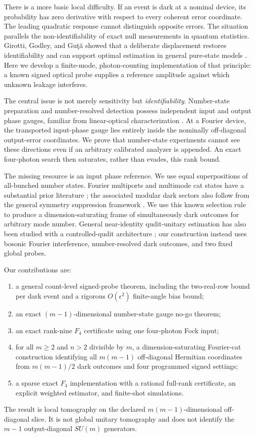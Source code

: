 \documentclass[aps,pra,reprint,amsmath,amssymb,superscriptaddress,longbibliography]{revtex4-2}
\begin{document}
There is a more basic local difficulty.  If an event is dark at a nominal
device, its probability has zero derivative with respect to every coherent
error coordinate.  The leading quadratic response cannot distinguish
opposite errors.  The situation parallels the non-identifiability of exact
null measurements in quantum statistics.  Girotti, Godley, and Guţă showed
that a deliberate displacement restores identifiability and can support
optimal estimation in general pure-state models \cite{Girotti2024}.  Here we
develop a finite-mode, photon-counting implementation of that principle:
a known signed optical probe supplies a reference amplitude against which
unknown leakage interferes.

The central issue is not merely sensitivity but \emph{identifiability}.
Number-state preparation and number-resolved detection possess independent
input and output phase gauges, familiar from linear-optical
characterization \cite{RahimiKeshari2013}.  At a Fourier device, the
transported input-phase gauge lies entirely inside the nominally
off-diagonal output-error coordinates.  We prove that number-state
experiments cannot see these directions even if an arbitrary calibrated
analyzer is appended.  An exact four-photon search then saturates, rather
than evades, this rank bound.

The missing resource is an input phase reference.  We use equal
superpositions of all-bunched number states.  Fourier multiports and
multimode cat states have a substantial prior literature
\cite{VourdasDunningham2005}; the associated modular dark sectors also
follow from the general symmetry suppression framework
\cite{Dittel2018PRA}.  We use this known selection rule to produce a
dimension-saturating frame of simultaneously dark outcomes for arbitrary
mode number.  General near-identity qudit-unitary estimation has also been studied
with a controlled-qudit architecture \cite{EscandonMonardes2024}; our
construction instead uses bosonic Fourier interference, number-resolved
dark outcomes, and two fixed global probes.

Our contributions are:
\begin{enumerate}
\item a general count-level signed-probe theorem, including the two-real-row
bound per dark event and a rigorous $O(\epsilon^2)$ finite-angle bias bound;
\item an exact $(m-1)$-dimensional number-state gauge no-go theorem;
\item an exact rank-nine $F_4$ certificate using one four-photon Fock input;
\item for all $m\geq2$ and $n>2$ divisible by $m$, a
dimension-saturating Fourier-cat construction identifying all $m(m-1)$
off-diagonal Hermitian coordinates from $m(m-1)/2$ dark outcomes and four
programmed signed settings;
\item a sparse exact $F_4$ implementation with a rational full-rank
certificate, an explicit weighted estimator, and finite-shot simulations.
\end{enumerate}
The result is local tomography on the declared $m(m-1)$-dimensional
off-diagonal slice.  It is not global unitary tomography and does not
identify the $m-1$ output-diagonal $SU(m)$ generators.
\end{document}
